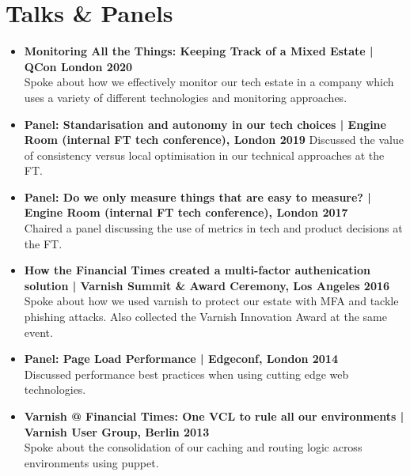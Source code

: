 \documentclass[a4paper]{article}
\begin{document}
\section*{Talks \& Panels}
\begin{itemize}

\item{\bf Monitoring All the Things: Keeping Track of a Mixed Estate | QCon London 2020}\\
Spoke about how we effectively monitor our tech estate in a company which uses a variety of different technologies and monitoring approaches.
\item{\bf Panel: Standarisation and autonomy in our tech choices | Engine Room (internal FT tech conference), London 2019}
Discussed the value of consistency versus local optimisation in our technical approaches at the FT.
\item{\bf Panel: Do we only measure things that are easy to measure? | Engine Room (internal FT tech conference), London 2017}\\
Chaired a panel discussing the use of metrics in tech and product decisions at the FT.
\item{\bf How the Financial Times created a multi-factor authenication solution | Varnish Summit \& Award Ceremony, Los Angeles 2016}
Spoke about how we used varnish to protect our estate with MFA and tackle phishing attacks.  Also collected the Varnish Innovation Award at the same event.
\item{\bf Panel: Page Load Performance | Edgeconf, London 2014 }\\
Discussed performance best practices when using cutting edge web technologies.
\item{\bf Varnish @ Financial Times: One VCL to rule all our environments | Varnish User Group, Berlin 2013}\\
Spoke about the consolidation of our caching and routing logic across environments using puppet.
\end{itemize}
\end{document}
